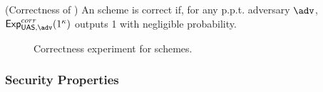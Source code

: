 \begin{definition}{(Correctness of \UAS)}
  \label{def:correctness-uas}
  An \UAS scheme is correct if, for any p.p.t. adversary $\adv$,
  $\ExpCorrect(1^\secpar)$ outputs 1 with negligible probability.
\end{definition}

\begin{figure}[htp!]
  \caption{Correctness experiment for \UAS schemes.}
  \label{fig:exp-uas-corr}
\end{figure}

\subsubsection{Security Properties}
\label{sssec:security}

